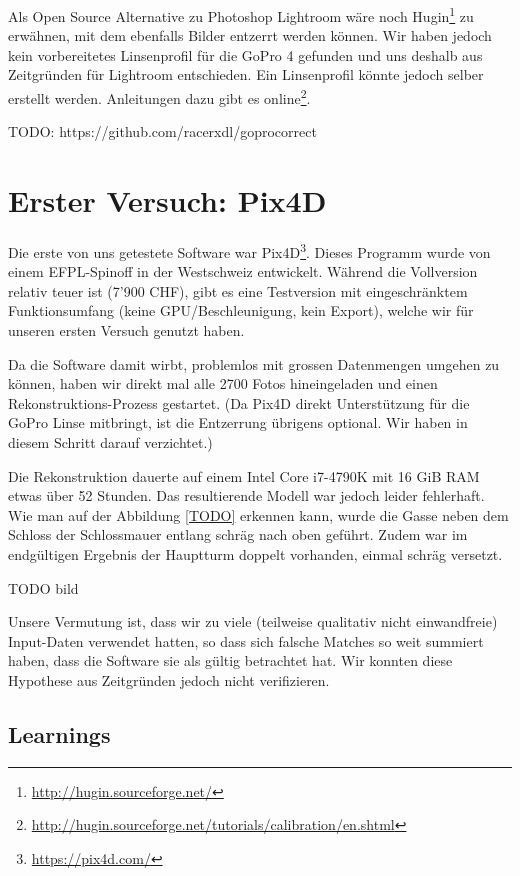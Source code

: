 Als Open Source Alternative zu Photoshop Lightroom wäre noch
Hugin\footnote{\url{http://hugin.sourceforge.net/}} zu erwähnen, mit dem
ebenfalls Bilder entzerrt werden können. Wir haben jedoch kein vorbereitetes
Linsenprofil für die GoPro 4 gefunden und uns deshalb aus Zeitgründen für
Lightroom entschieden. Ein Linsenprofil könnte jedoch selber erstellt werden.
Anleitungen dazu gibt es
online\footnote{\url{http://hugin.sourceforge.net/tutorials/calibration/en.shtml}}.

TODO: https://github.com/racerxdl/goprocorrect


\section{Erster Versuch: Pix4D}

Die erste von uns getestete Software war
Pix4D\footnote{\url{https://pix4d.com/}}. Dieses Programm wurde von einem
EFPL-Spinoff in der Westschweiz entwickelt. Während die Vollversion relativ
teuer ist (7'900 CHF), gibt es eine Testversion mit eingeschränktem
Funktionsumfang (keine GPU\-/Beschleunigung, kein Export), welche wir für
unseren ersten Versuch genutzt haben.

Da die Software damit wirbt, problemlos mit grossen Datenmengen umgehen zu
können, haben wir direkt mal alle 2700 Fotos hineingeladen und einen
Rekonstruktions-Prozess gestartet. (Da Pix4D direkt Unterstützung für die GoPro
Linse mitbringt, ist die Entzerrung übrigens optional. Wir haben in diesem
Schritt darauf verzichtet.)

Die Rekonstruktion dauerte auf einem Intel Core i7-4790K mit 16 GiB RAM etwas
über 52 Stunden. Das resultierende Modell war jedoch leider fehlerhaft. Wie man
auf der Abbildung \ref{TODO} erkennen kann, wurde die Gasse neben dem Schloss
der Schlossmauer entlang schräg nach oben geführt. Zudem war im endgültigen
Ergebnis der Hauptturm doppelt vorhanden, einmal schräg versetzt.

TODO bild

Unsere Vermutung ist, dass wir zu viele (teilweise qualitativ nicht
einwandfreie) Input-Daten verwendet hatten, so dass sich falsche Matches so weit
summiert haben, dass die Software sie als gültig betrachtet hat. Wir konnten
diese Hypothese aus Zeitgründen jedoch nicht verifizieren.

\subsection{Learnings}


